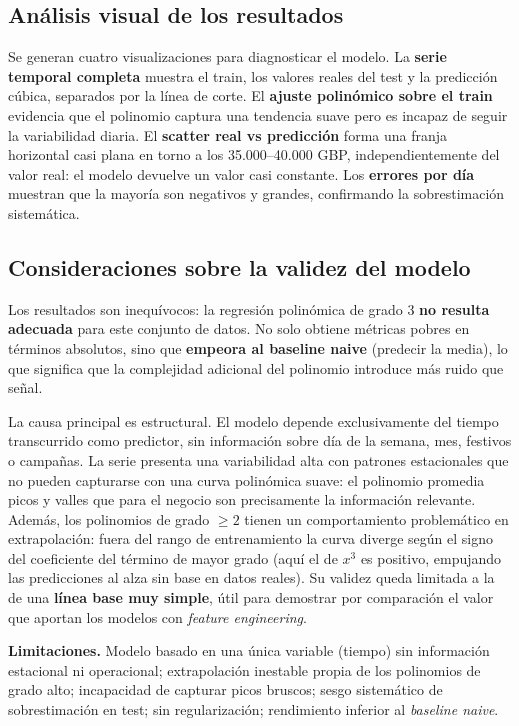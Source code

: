 \documentclass[11pt,a4paper]{article}
\begin{document}
\subsection{Análisis visual de los resultados}

Se generan cuatro visualizaciones para diagnosticar el modelo. La \textbf{serie temporal completa} muestra el train, los valores reales del test y la predicción cúbica, separados por la línea de corte. El \textbf{ajuste polinómico sobre el train} evidencia que el polinomio captura una tendencia suave pero es incapaz de seguir la variabilidad diaria. El \textbf{scatter real vs predicción} forma una franja horizontal casi plana en torno a los 35.000--40.000 GBP, independientemente del valor real: el modelo devuelve un valor casi constante. Los \textbf{errores por día} muestran que la mayoría son negativos y grandes, confirmando la sobrestimación sistemática.

\subsection{Consideraciones sobre la validez del modelo}

Los resultados son inequívocos: la regresión polinómica de grado 3 \textbf{no resulta adecuada} para este conjunto de datos. No solo obtiene métricas pobres en términos absolutos, sino que \textbf{empeora al baseline naive} (predecir la media), lo que significa que la complejidad adicional del polinomio introduce más ruido que señal.

La causa principal es estructural. El modelo depende exclusivamente del tiempo transcurrido como predictor, sin información sobre día de la semana, mes, festivos o campañas. La serie presenta una variabilidad alta con patrones estacionales que no pueden capturarse con una curva polinómica suave: el polinomio promedia picos y valles que para el negocio son precisamente la información relevante. Además, los polinomios de grado $\geq 2$ tienen un comportamiento problemático en extrapolación: fuera del rango de entrenamiento la curva diverge según el signo del coeficiente del término de mayor grado (aquí el de $x^3$ es positivo, empujando las predicciones al alza sin base en datos reales). Su validez queda limitada a la de una \textbf{línea base muy simple}, útil para demostrar por comparación el valor que aportan los modelos con \textit{feature engineering}.

\textbf{Limitaciones.} Modelo basado en una única variable (tiempo) sin información estacional ni operacional; extrapolación inestable propia de los polinomios de grado alto; incapacidad de capturar picos bruscos; sesgo sistemático de sobrestimación en test; sin regularización; rendimiento inferior al \textit{baseline naive}.
\end{document}
